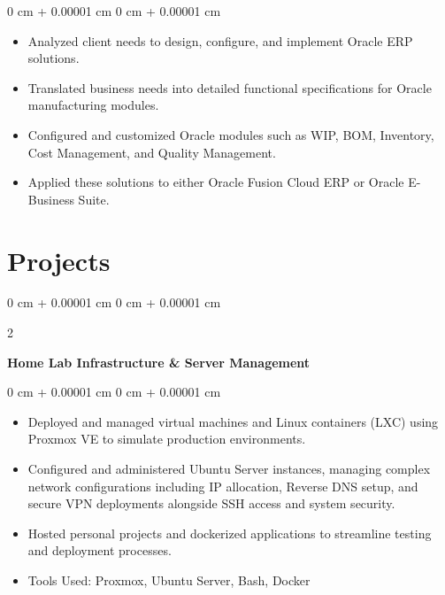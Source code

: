 \documentclass[10pt, letterpaper]{article}
\newenvironment{highlights}{
    \begin{itemize}[
        topsep=0.10 cm,
        parsep=0.10 cm,
        partopsep=0pt,
        itemsep=0pt,
        leftmargin=0 cm + 10pt
    ]
}{
    \end{itemize}
} %
\newenvironment{onecolentry}{
    \begin{adjustwidth}{
        0 cm + 0.00001 cm
    }{
        0 cm + 0.00001 cm
    }
}{
    \end{adjustwidth}
} %
\newenvironment{twocolentry}[2][]{
    \onecolentry
    \def\secondColumn{#2}
    \setcolumnwidth{\fill, 4.5 cm}
    \begin{paracol}{2}
}{
    \switchcolumn \raggedleft \secondColumn
    \end{paracol}
    \endonecolentry
} %
\begin{document}
        \vspace{0.10 cm}
        \begin{onecolentry}
            \begin{highlights}
                \item Analyzed client needs to design, configure, and implement Oracle ERP solutions.
                \item Translated business needs into detailed functional specifications for Oracle manufacturing modules.
                \item Configured and customized Oracle modules such as WIP, BOM, Inventory, Cost Management, and Quality Management.
                \item Applied these solutions to either Oracle Fusion Cloud ERP or Oracle E-Business Suite.
            \end{highlights}
        \end{onecolentry}


    
    \section{Projects}

        \begin{twocolentry}{
        }
            \textbf{Home Lab Infrastructure \& Server Management}\end{twocolentry}

        \vspace{0.10 cm}
        \begin{onecolentry}
            \begin{highlights}
                \item Deployed and managed virtual machines and Linux containers (LXC) using Proxmox VE to simulate production environments.
                \item Configured and administered Ubuntu Server instances, managing complex network configurations including IP allocation, Reverse DNS setup, and secure VPN deployments alongside SSH access and system security.
                \item Hosted personal projects and dockerized applications  to streamline testing and deployment processes.
                \item Tools Used: Proxmox, Ubuntu Server, Bash, Docker
            \end{highlights}
        \end{onecolentry}
\end{document}

